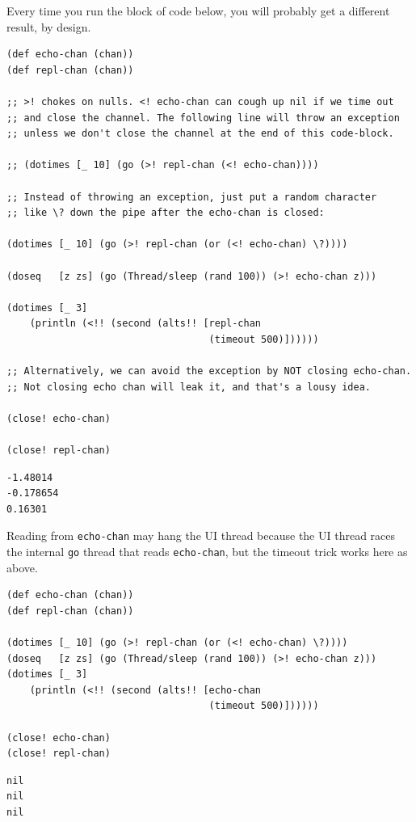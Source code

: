 \documentclass[10pt,oneside,x11names]{article}
\begin{document}
Every time you run the block of code below, you will probably get a different
result, by design.

\begin{verbatim}
(def echo-chan (chan))
(def repl-chan (chan))

;; >! chokes on nulls. <! echo-chan can cough up nil if we time out
;; and close the channel. The following line will throw an exception
;; unless we don't close the channel at the end of this code-block.

;; (dotimes [_ 10] (go (>! repl-chan (<! echo-chan))))

;; Instead of throwing an exception, just put a random character
;; like \? down the pipe after the echo-chan is closed:

(dotimes [_ 10] (go (>! repl-chan (or (<! echo-chan) \?))))

(doseq   [z zs] (go (Thread/sleep (rand 100)) (>! echo-chan z)))

(dotimes [_ 3]
    (println (<!! (second (alts!! [repl-chan
                                   (timeout 500)])))))

;; Alternatively, we can avoid the exception by NOT closing echo-chan.
;; Not closing echo chan will leak it, and that's a lousy idea.

(close! echo-chan)

(close! repl-chan)
\end{verbatim}

\begin{verbatim}
-1.48014
-0.178654
0.16301
\end{verbatim}


Reading from \texttt{echo-chan} may hang the UI thread because the UI thread
races the internal \texttt{go} thread that reads \texttt{echo-chan}, but the timeout trick
works here as above.

\begin{verbatim}
(def echo-chan (chan))
(def repl-chan (chan))

(dotimes [_ 10] (go (>! repl-chan (or (<! echo-chan) \?))))
(doseq   [z zs] (go (Thread/sleep (rand 100)) (>! echo-chan z)))
(dotimes [_ 3]
    (println (<!! (second (alts!! [echo-chan
                                   (timeout 500)])))))

(close! echo-chan)
(close! repl-chan)
\end{verbatim}

\begin{verbatim}
nil
nil
nil
\end{verbatim}
\end{document}
